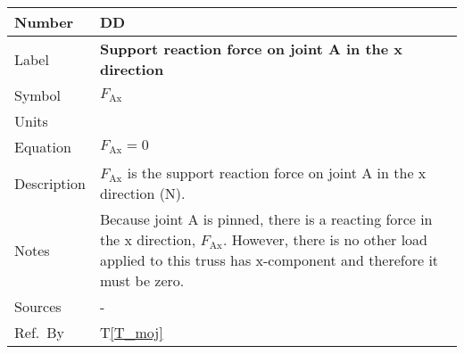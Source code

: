 \documentclass[12pt]{article}
\newcommand{\colAwidth}{0.13\textwidth}
\newcommand{\colBwidth}{0.82\textwidth}
\newcounter{defnum} %
\newcounter{datadefnum} %
\newcommand{\tref}[1]{T\ref{#1}}
\begin{document}
\noindent
\begin{minipage}{\textwidth}
	\renewcommand*{\arraystretch}{1.5}
	\begin{tabular}{| p{\colAwidth} | p{\colBwidth}|}
		\hline
		\rowcolor[gray]{0.9}
		Number& DD{datadefnum}\thedatadefnum \label{D_forceAx}\\
		\hline
		Label& \bf Support reaction force on joint A in the x direction\\
		\hline
		Symbol &$F_{\text{Ax}}$\\
		\hline
		Units & \text{N} \\
		\hline
		Equation&$F_{\text{Ax}} = 0$\\
		\hline
		Description &$F_{\text{Ax}}$ is the support reaction force on joint A 
		in the x direction (N).\\
		\hline
		Notes &Because joint A is pinned, there is a reacting force in the x 
		direction, $F_{\text{Ax}}$. However, there is no other load applied to 
		this truss has x-component and therefore it must be zero.\\
		\hline
		Sources& -\\
		\hline
		Ref.\ By & \tref{T_moj}\\
		\hline
	\end{tabular}
\end{minipage}\\
\end{document}

